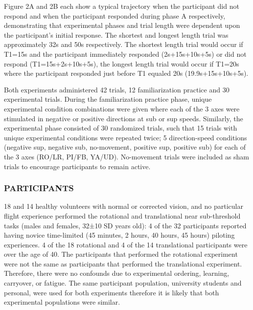 \documentclass[11pt, onecolumn]{article}
\begin{document}
Figure 2A and 2B each show a typical trajectory when the participant did not respond and when the participant responded during phase A respectively, demonstrating that experimental phases and trial length were dependent upon the participant’s initial response.  The shortest and longest length trial was approximately 32s and 50s respectively.  The shortest length trial would occur if T1=15s and the participant immediately responded (2s+15s+10s+5s) or did not respond  (T1=15s+2s+10s+5s), the longest length trial would occur if T1=20s where the participant responded just before T1 equaled 20s (19.9s+15s+10s+5s).

Both experiments administered 42 trials, 12 familiarization practice and 30 experimental trials.  During the familiarization practice phase, unique experimental condition combinations were given where each of the 3 axes were stimulated in negative or positive directions at sub or sup speeds.  Similarly, the experimental phase consisted of 30 randomized trials, such that 15 trials with unique experimental conditions were repeated twice; 5 direction-speed conditions (negative sup, negative sub, no-movement, positive sup, positive sub) for each of the 3 axes (RO/LR, PI/FB, YA/UD).  No-movement trials were included as sham trials to encourage participants to remain active.

\subsubsection{PARTICIPANTS}
18 and 14 healthy volunteers with normal or corrected vision, and no particular flight experience performed the rotational and translational near sub-threshold tasks (males and females, 32±10 SD years old): 4 of the 32 participants reported having novice time-limited (45 minutes, 2 hours, 40 hours, 45 hours) piloting experiences. 4 of the 18 rotational and 4 of the 14 translational participants were over the age of 40. The participants that performed the rotational experiment were not the same as participants that performed the translational experiment. Therefore, there were no confounds due to experimental ordering, learning, carryover, or fatigue. The same participant population, university students and personal, were used for both experiments therefore it is likely that both experimental populations were similar.
\end{document}
